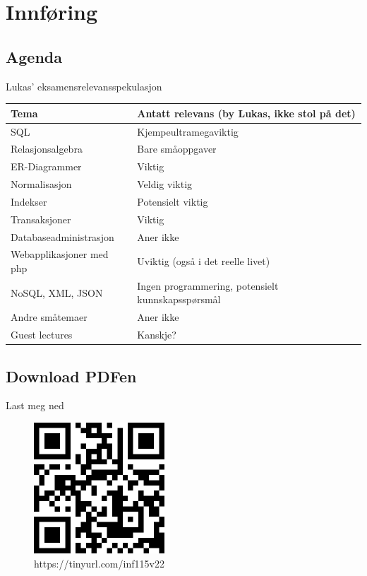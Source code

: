 
\begin{frame}[t,plain]
    \titlepage
\end{frame}

\section{Innføring}
\subsection*{Agenda}
\begin{frame}
    \tableofcontents
\end{frame}

\begin{frame}{Lukas' eksamensrelevansspekulasjon}
    \begin{tabular}{l|l}
    Tema & Antatt relevans (by Lukas, ikke stol på det)\\\hline\pause
    SQL & Kjempeultramegaviktig\\\pause
    Relasjonsalgebra & Bare småoppgaver\\\pause
    ER-Diagrammer & Viktig\\\pause
    Normalisasjon & Veldig viktig\\\pause
    Indekser & Potensielt viktig\\\pause
    Transaksjoner & Viktig\\\pause
    Databaseadministrasjon & Aner ikke\\\pause
    Webapplikasjoner med php & Uviktig (også i det reelle livet)\\\pause
    NoSQL, XML, JSON & Ingen programmering, potensielt kunnskapsspørsmål\\\pause
    Andre småtemaer & Aner ikke\\\pause
    Guest lectures & Kanskje?
    \end{tabular}
\end{frame}

\subsection*{Download PDFen}
\begin{frame}{Last meg ned}
    \begin{figure}
        \centering
        \includegraphics[height = 4.9cm]{images/downloadqr.png}
        \caption{https://tinyurl.com/inf115v22}
        \label{fig:qrcode}
    \end{figure}
\end{frame}

